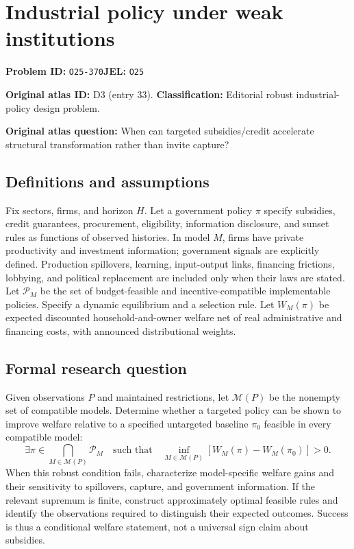 \documentclass[11pt,a4paper]{article}
\begin{document}
\section*{Industrial policy under weak institutions}
\textbf{Problem ID:} \texttt{O25-370}\quad \textbf{JEL:} \texttt{O25}\par
\label{problem:OP-0033}
\label{atlas:prob:D3}
\noindent\textbf{Original atlas ID:} D3 (entry 33). \textbf{Classification:} Editorial robust industrial-policy design problem.

\noindent\textbf{Original atlas question:} When can targeted subsidies/credit accelerate structural transformation rather than invite capture?

\subsection*{Definitions and assumptions}
Fix sectors, firms, and horizon $H$. Let a government policy $\pi$ specify subsidies, credit guarantees, procurement, eligibility, information disclosure, and sunset rules as functions of observed histories. In model $M$, firms have private productivity and investment information; government signals are explicitly defined. Production spillovers, learning, input-output links, financing frictions, lobbying, and political replacement are included only when their laws are stated. Let $\mathcal P_M$ be the set of budget-feasible and incentive-compatible implementable policies. Specify a dynamic equilibrium and a selection rule. Let $W_M(\pi)$ be expected discounted household-and-owner welfare net of real administrative and financing costs, with announced distributional weights.
\subsection*{Formal research question}
Given observations $P$ and maintained restrictions, let $\mathcal M(P)$ be the nonempty set of compatible models. Determine whether a targeted policy can be shown to improve welfare relative to a specified untargeted baseline $\pi_0$ feasible in every compatible model:
\[
 \exists\pi\in\bigcap_{M\in\mathcal M(P)}\mathcal P_M
 \quad\text{such that}\quad
 \inf_{M\in\mathcal M(P)}[W_M(\pi)-W_M(\pi_0)]>0.
\]
When this robust condition fails, characterize model-specific welfare gains and their sensitivity to spillovers, capture, and government information. If the relevant supremum is finite, construct approximately optimal feasible rules and identify the observations required to distinguish their expected outcomes. Success is thus a conditional welfare statement, not a universal sign claim about subsidies.
\end{document}
